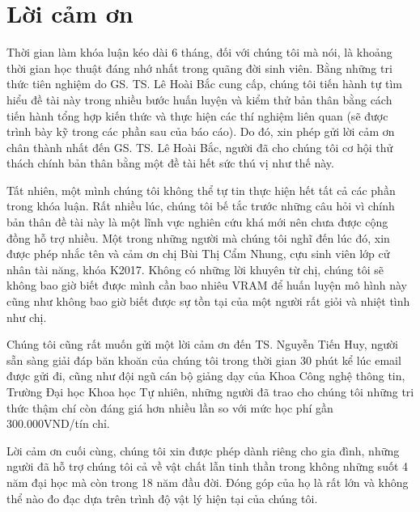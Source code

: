 \chapter*{Lời cảm ơn}
\label{thanks}

Thời gian làm khóa luận kéo dài 6 tháng, đối với chúng tôi mà nói, là khoảng thời gian học thuật đáng nhớ nhất trong quãng đời sinh viên. Bằng những tri thức tiên nghiệm do GS. TS. Lê Hoài Bắc cung cấp, chúng tôi tiến hành tự tìm hiểu đề tài này trong nhiều bước huấn luyện và kiểm thử bản thân bằng cách tiến hành tổng hợp kiến thức và thực hiện các thí nghiệm liên quan (sẽ được trình bày kỹ trong các phần sau của báo cáo). Do đó, xin phép gửi lời cảm ơn chân thành nhất đến GS. TS. Lê Hoài Bắc, người đã cho chúng tôi cơ hội thử thách chính bản thân bằng một đề tài hết sức thú vị như thế này.

Tất nhiên, một mình chúng tôi không thể tự tin thực hiện hết tất cả các phần trong khóa luận. Rất nhiều lúc, chúng tôi bế tắc trước những câu hỏi vì chính bản thân đề tài này là một lĩnh vực nghiên cứu khá mới nên chưa được cộng đồng hỗ trợ nhiều. Một trong những người mà chúng tôi nghĩ đến lúc đó, xin được phép nhắc tên và cảm ơn chị Bùi Thị Cẩm Nhung, cựu sinh viên lớp cử nhân tài năng, khóa K2017. Không có những lời khuyên từ chị, chúng tôi sẽ không bao giờ biết được mình cần bao nhiêu VRAM để huấn luyện mô hình này cũng như không bao giờ biết được sự tồn tại của một người rất giỏi và nhiệt tình như chị.

Chúng tôi cũng rất muốn gửi một lời cảm ơn đến TS. Nguyễn Tiến Huy, người sẵn sàng giải đáp băn khoăn của chúng tôi trong thời gian 30 phút kể lúc email được gửi đi, cũng như đội ngũ cán bộ giảng dạy của Khoa Công nghệ thông tin, Trường Đại học Khoa học Tự nhiên, những người đã trao cho chúng tôi những tri thức thậm chí còn đáng giá hơn nhiều lần so với mức học phí gần 300.000VND/tín chỉ.

Lời cảm ơn cuối cùng, chúng tôi xin được phép dành riêng cho gia đình, những người đã hỗ trợ chúng tôi cả về vật chất lẫn tinh thần trong không những suốt 4 năm đại học mà còn trong 18 năm đầu đời. Đóng góp của họ là rất lớn và không thể nào đo đạc dựa trên trình độ vật lý hiện tại của chúng tôi.
